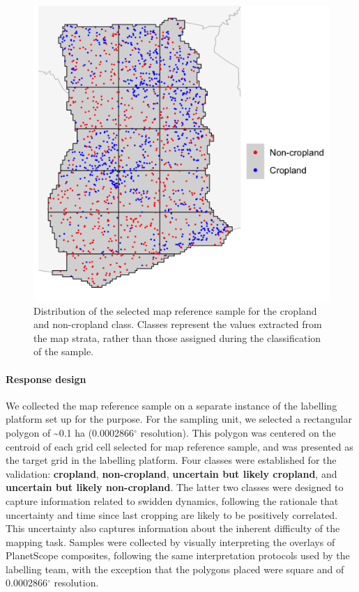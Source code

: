 \documentclass[
  11pt,
  a4paper]{article}
\begin{document}
\begin{figure}[!ht]

{\centering \includegraphics[width=0.8\linewidth,]{figures/si_map_reference_sample} 

}

\caption{Distribution of the selected map reference sample for the cropland and non-cropland class. Classes represent the values extracted from the map strata, rather than those assigned during the classification of the sample.}\label{fig:refsample}
\end{figure}

\hypertarget{response-design}{%
\paragraph{Response design}\label{response-design}}

We collected the map reference sample on a separate instance of the
labelling platform set up for the purpose. For the sampling unit, we
selected a rectangular polygon of \textasciitilde0.1 ha
(0.0002866\(^\circ\) resolution). This polygon was centered on the
centroid of each grid cell selected for map reference sample, and was
presented as the target grid in the labelling platform. Four classes
were established for the validation: \textbf{cropland},
\textbf{non-cropland}, \textbf{uncertain but likely cropland}, and
\textbf{uncertain but likely non-cropland}. The latter two classes were
designed to capture information related to swidden dynamics, following
the rationale that uncertainty and time since last cropping are likely
to be positively correlated. This uncertainty also captures information
about the inherent difficulty of the mapping task. Samples were
collected by visually interpreting the overlays of PlanetScope
composites, following the same interpretation protocols used by the
labelling team, with the exception that the polygons placed were square
and of 0.0002866\(^\circ\) resolution.
\end{document}
